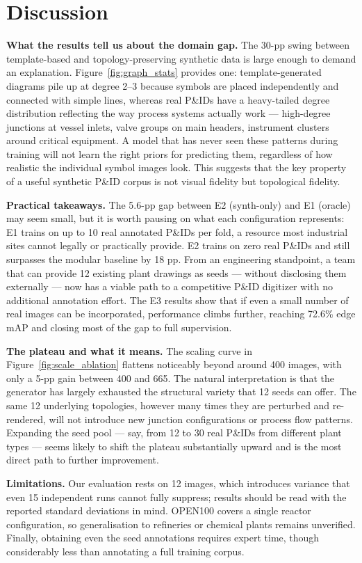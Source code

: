 \section{Discussion}
\label{sec:discussion}

\noindent\textbf{What the results tell us about the domain gap.}
The 30-pp swing between template-based and topology-preserving
synthetic data is large enough to demand an explanation.
Figure~\ref{fig:graph_stats} provides one: template-generated diagrams
pile up at degree 2--3 because symbols are placed independently and
connected with simple lines, whereas real P\&IDs have a heavy-tailed
degree distribution reflecting the way process systems actually work ---
high-degree junctions at vessel inlets, valve groups on main headers,
instrument clusters around critical equipment.
A model that has never seen these patterns during training will not
learn the right priors for predicting them, regardless of how
realistic the individual symbol images look.
This suggests that the key property of a useful synthetic P\&ID
corpus is not visual fidelity but topological fidelity.

\noindent\textbf{Practical takeaways.}
The 5.6-pp gap between E2 (synth-only) and E1 (oracle) may seem small,
but it is worth pausing on what each configuration represents:
E1 trains on up to 10 real annotated P\&IDs per fold, a resource most
industrial sites cannot legally or practically provide.
E2 trains on zero real P\&IDs and still surpasses the modular baseline
by 18 pp.
From an engineering standpoint, a team that can provide 12 existing
plant drawings as seeds --- without disclosing them externally ---
now has a viable path to a competitive P\&ID digitizer with no additional
annotation effort.
The E3 results show that if even a small number of real images can be
incorporated, performance climbs further, reaching 72.6\% edge mAP and
closing most of the gap to full supervision.

\noindent\textbf{The plateau and what it means.}
The scaling curve in Figure~\ref{fig:scale_ablation} flattens noticeably
beyond around 400 images, with only a 5-pp gain between 400 and 665.
The natural interpretation is that the generator has largely exhausted
the structural variety that 12 seeds can offer.
The same 12 underlying topologies, however many times they are perturbed
and re-rendered, will not introduce new junction configurations or
process flow patterns.
Expanding the seed pool --- say, from 12 to 30 real P\&IDs from
different plant types --- seems likely to shift the plateau substantially
upward and is the most direct path to further improvement.

\noindent\textbf{Limitations.}
Our evaluation rests on 12 images, which introduces variance that
even 15 independent runs cannot fully suppress; results should be
read with the reported standard deviations in mind.
OPEN100 covers a single reactor configuration, so generalisation to
refineries or chemical plants remains unverified.
Finally, obtaining even the seed annotations requires expert time,
though considerably less than annotating a full training corpus.
